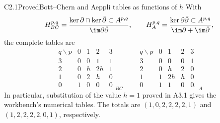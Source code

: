 \begin{claim}{C2.1}{Proved}{Bott--Chern and Aeppli tables as functions of $h$}
With
\[
H^{p,q}_{BC}=
\frac{\ker\partial\cap\ker\bar\partial\subset A^{p,q}}
{\im\partial\bar\partial},\qquad
H^{p,q}_{A}=
\frac{\ker\partial\bar\partial\subset A^{p,q}}
{\im\partial+\im\bar\partial},
\]
the complete tables are
\begin{equation}\label{eq:C-BC-A}
\begin{array}{c|rrrr}
q\backslash p&0&1&2&3\\\hline
3&0&0&1&1\\
2&0&h&2h&1\\
1&0&2&h&0\\
0&1&0&0&0
\end{array}_{BC}
\qquad
\begin{array}{c|rrrr}
q\backslash p&0&1&2&3\\\hline
3&0&0&0&1\\
2&0&h&2&0\\
1&1&2h&h&0\\
0&1&1&0&0.
\end{array}_{A}
\end{equation}
In particular, substitution of the value $h=1$ proved in A3.1 gives
the workbench's numerical tables.  The totals are
$(1,0,2,2,2,2,1)$ and $(1,2,2,2,2,0,1)$, respectively.
\end{claim}
